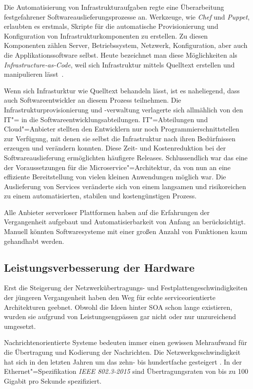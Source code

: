 Die Automatisierung von Infrastrukturaufgaben regte eine Überarbeitung festgefahrener Softwareauslieferungsprozesse an. Werkzeuge, wie \textit{Chef} und \textit{Puppet}, erlaubten es erstmals, Skripte für die automatische Provisionierung und Konfiguration von Infrastrukturkomponenten zu erstellen. Zu diesen Komponenten zählen Server, Betriebssystem, Netzwerk, Konfiguration, aber auch die Applikationssoftware selbst. Heute bezeichnet man diese Möglichkeiten als \textit{Infrastructure-as-Code}, weil sich Infrastruktur mittels Quelltext erstellen und manipulieren lässt~\cite[135]{Httermann:2012:DD:2380958}.

Wenn sich Infrasturktur wie Quelltext behandeln lässt, ist es naheliegend, dass auch Softwareentwickler an diesem Prozess teilnehmen. Die Infrastrukturprovisionierung und -verwaltung verlagerte sich allmählich von den IT"= in die Softwareentwicklungsabteilungen. IT"=Abteilungen und Cloud"=Anbieter stellten den Entwicklern nur noch Programmierschnittstellen zur Verfügung, mit denen sie selbst die Infrastruktur nach ihren Bedürfnissen erzeugen und verändern konnten. Diese Zeit- und Kostenreduktion bei der Softwareauslieferung ermöglichten häufigere Releases. Schlussendlich war das eine der Voraussetzungen für die Microservice"=Architektur, da von nun an eine effiziente Bereitstellung von vielen kleinen Anwendungen möglich war. Die Auslieferung von Services veränderte sich von einem langsamen und risikoreichen zu einem automatisierten, stabilen und kostengünstigen Prozess.

Alle Anbieter serverloser Plattformen haben auf die Erfahrungen der Vergangenheit aufgebaut und Automatisierbarkeit von Anfang an berücksichtigt. Manuell könnten Softwaresysteme mit einer großen Anzahl von Funktionen kaum gehandhabt werden. 

\subsection{Leistungsverbesserung der Hardware}

Erst die Steigerung der Netzwerkübertragungs- und Festplattengeschwindigkeiten der jüngeren Vergangenheit haben den Weg für echte serviceorientierte Architekturen geebnet. Obwohl die Ideen hinter SOA schon lange existieren, wurden sie aufgrund von Leistungsengpässen gar nicht oder nur unzureichend umgesetzt.

Nachrichtenorientierte Systeme bedeuten immer einen gewissen Mehraufwand für die Übertragung und Kodierung der Nachrichten. Die Netzwerkgeschwindigkeit hat sich in den letzten Jahren um das zehn- bis hundertfache gesteigert \cite{IEEEBandwidth}. In der Ethernet"=Spezifikation \textit{IEEE 802.3-2015} sind Übertragungsraten von bis zu 100 Gigabit pro Sekunde spezifiziert.

